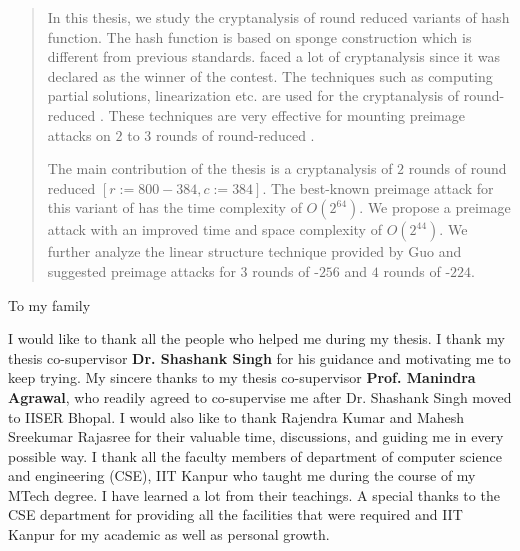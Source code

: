 \begin{abstract}
	
In this thesis, we study the cryptanalysis of round reduced variants of
\KECCAK{} hash function. The \KECCAK{} hash function is based on sponge
construction which is different from previous \SHA{} standards. 
\KECCAK{} faced a lot of cryptanalysis since it was declared as the
winner of the  contest. The techniques such as computing partial
solutions,  linearization etc. are used for the cryptanalysis of
round-reduced \KECCAK{}. These techniques are very effective for
mounting preimage attacks on $2$ to $3$ rounds of round-reduced \KECCAK{}. 

The main contribution of the thesis is a cryptanalysis of $2$ rounds of 
round reduced
\KECCAK{}$[r:=800-384, c:=384]$. 
The best-known preimage
attack for this variant of \KECCAK{} has the time complexity of
 $O(2^{64})$. We propose a preimage attack with an improved time and
space complexity of $O(2^{44})$. We further analyze the linear structure
technique provided by Guo \etal and suggested preimage attacks for $3$ rounds of \KECCAK-$256$ and $4$ rounds of \KECCAK-$224$.
\end{abstract}

\begin{dedication}
To my family
\end{dedication}

\begin{acknowledgments}

I would like to thank all the people who helped me during my thesis. I thank my thesis co-supervisor \textbf{Dr. Shashank Singh} for his guidance and motivating me to keep trying.
My sincere thanks to my thesis co-supervisor \textbf{Prof. Manindra Agrawal}, who readily agreed to co-supervise me after Dr. Shashank Singh moved to IISER Bhopal. 
% 
% 
 I would also like to thank Rajendra Kumar and Mahesh Sreekumar Rajasree
  for their valuable time, discussions, and guiding me in every possible
  way. I thank all the faculty members of department of computer science
  and engineering (CSE), IIT Kanpur who taught me during the course of my
  MTech degree. I have learned a lot from their teachings. A special
  thanks to the CSE department for providing all the facilities that were required and  IIT Kanpur for my academic as well as personal growth.
\end{acknowledgments}

\tableofcontents
\listoftables

\cleardoublepage
{} \label{listoffig}
\listoffigures

\cleardoublepage{} %
